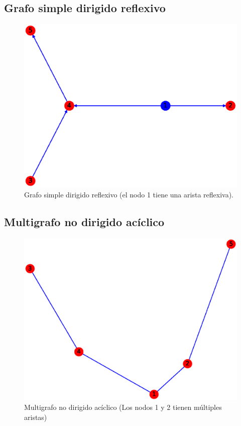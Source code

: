 \documentclass{article}
\begin{document}
\subsection{Grafo simple dirigido reflexivo}
\begin{figure}[H]
    \includegraphics[width=\textwidth]{6-GSDR}
    \caption{Grafo simple dirigido reflexivo (el nodo 1 tiene una arista reflexiva).}
    \label{fig:GSDR}
\end{figure}


\subsection{Multigrafo no dirigido acíclico}
\begin{figure}[H]
    \includegraphics[width=\textwidth]{7-MNDA}
    \caption{Multigrafo no dirigido acíclico (Los nodos 1 y 2 tienen múltiples aristas)}
    \label{fig:MNDA}
\end{figure}
\end{document}
